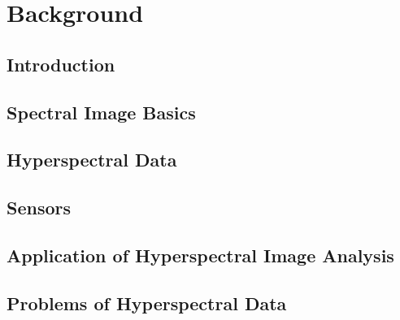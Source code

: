 \documentclass[document.tex]{subfiles}
\begin{document}
\chapter{Background}

\section{Introduction}

\section{Spectral Image Basics}

\section{Hyperspectral Data}

\section{Sensors}

\section{Application of Hyperspectral Image Analysis}

\section{Problems of Hyperspectral Data}
\end{document}
